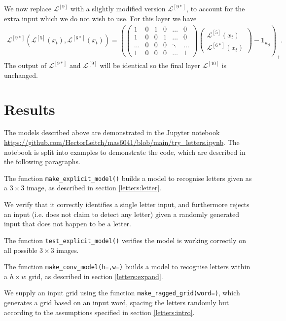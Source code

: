 \documentclass{somasmsc}
\begin{document}
We now replace $\mathcal{L}^{\left[9\right]}$ with a slightly modified version $\mathcal{L}^{\left[9*\right]}$, to account for the extra input which we do not wish to use. For this layer we have
\begin{align*}
\mathcal{L}^{\left[9*\right]}\left(\mathcal{L}^{\left[5\right]}\left(x_t\right), \mathcal{L}^{\left[6*\right]}\left(x_t\right)\right) = \left(
\begin{pmatrix}
    1 & 0 & 1 & 0 & \dots & 0 \\
    1 & 0 & 0 & 1 & \dots & 0 \\
    \dots & 0 & 0 & 0 & \ddots & \dots \\
    1 & 0 & 0 & 0 & \dots & 1
\end{pmatrix}
\begin{pmatrix}
    \mathcal{L}^{\left[5\right]}\left(x_t\right) \\
    \mathcal{L}^{\left[6*\right]}\left(x_t\right)
\end{pmatrix}
- \mathbf{1}_{w_g}\right)_+.
\end{align*}
The output of $\mathcal{L}^{\left[9*\right]}$ and $\mathcal{L}^{\left[9\right]}$ will be identical so the final layer $\mathcal{L}^{\left[10\right]}$ is unchanged.

\section{Results}

The models described above are demonstrated in the Jupyter notebook \url{https://github.com/HectorLeitch/mas6041/blob/main/try_letters.ipynb}. The notebook is split into examples to demonstrate the code, which are described in the following paragraphs.

\begin{exa}
The function \verb|make_explicit_model()| builds a model to recognise letters given as a $3 \times 3$ image, as described in section \ref{letters:letter}.

We verify that it correctly identifies a single letter input, and furthermore rejects an input (i.e. does not claim to detect any letter) given a randomly generated input that does not happen to be a letter.

The function \verb|test_explicit_model()| verifies the model is working correctly on all possible $3 \times 3$ images.
\end{exa}

\begin{exa}
The function \verb|make_conv_model(h=,w=)| builds a model to recognise letters within a $h \times w$ grid, as described in section \ref{letters:expand}.

We supply an input grid using the function \verb|make_ragged_grid(word=)|, which generates a grid based on an input word, spacing the letters randomly but according to the assumptions specified in section \ref{letters:intro}.
\end{exa}
\end{document}
